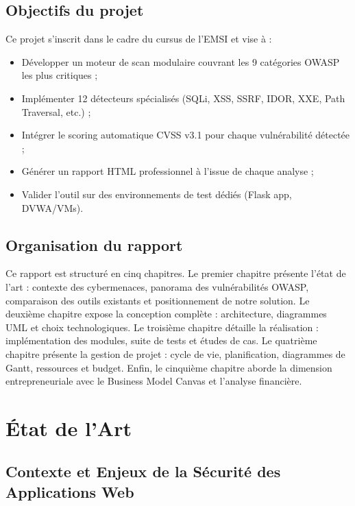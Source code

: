 \documentclass[12pt,a4paper]{report}
\begin{document}
\section*{Objectifs du projet}

Ce projet s'inscrit dans le cadre du cursus de l'EMSI et vise à :

\begin{itemize}
  \item Développer un moteur de scan modulaire couvrant les 9 catégories OWASP les plus critiques ;
  \item Implémenter 12 détecteurs spécialisés (SQLi, XSS, SSRF, IDOR, XXE, Path Traversal, etc.) ;
  \item Intégrer le scoring automatique CVSS v3.1 pour chaque vulnérabilité détectée ;
  \item Générer un rapport HTML professionnel à l'issue de chaque analyse ;
  \item Valider l'outil sur des environnements de test dédiés (Flask app, DVWA/VMs).
\end{itemize}

\section*{Organisation du rapport}

Ce rapport est structuré en cinq chapitres. Le premier chapitre présente l'état de l'art :
contexte des cybermenaces, panorama des vulnérabilités OWASP, comparaison des outils
existants et positionnement de notre solution. Le deuxième chapitre expose la conception
complète : architecture, diagrammes UML et choix technologiques. Le troisième chapitre
détaille la réalisation : implémentation des modules, suite de tests et études de cas.
Le quatrième chapitre présente la gestion de projet : cycle de vie, planification, diagrammes
de Gantt, ressources et budget. Enfin, le cinquième chapitre aborde la dimension
entrepreneuriale avec le Business Model Canvas et l'analyse financière.
\chapter{État de l'Art}

\section{Contexte et Enjeux de la Sécurité des Applications Web}
\end{document}
